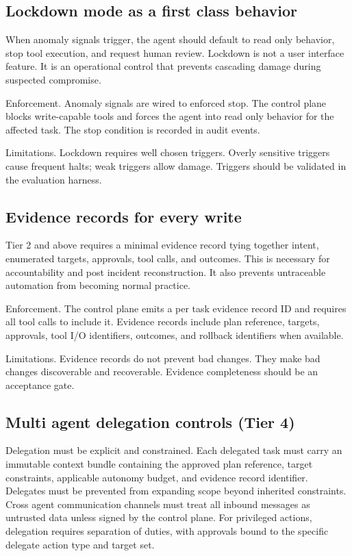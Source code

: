 \documentclass[11pt]{article}
\begin{document}
\subsection{Lockdown mode as a first class behavior}
When anomaly signals trigger, the agent should default to read only behavior, stop tool execution, and request human review. Lockdown is not a user interface feature. It is an operational control that prevents cascading damage during suspected compromise.

Enforcement. Anomaly signals are wired to enforced stop. The control plane blocks write-capable tools and forces the agent into read only behavior for the affected task. The stop condition is recorded in audit events.

Limitations. Lockdown requires well chosen triggers. Overly sensitive triggers cause frequent halts; weak triggers allow damage. Triggers should be validated in the evaluation harness.

\subsection{Evidence records for every write}
Tier 2 and above requires a minimal evidence record tying together intent, enumerated targets, approvals, tool calls, and outcomes. This is necessary for accountability and post incident reconstruction. It also prevents untraceable automation from becoming normal practice.

Enforcement. The control plane emits a per task evidence record ID and requires all tool calls to include it. Evidence records include plan reference, targets, approvals, tool I/O identifiers, outcomes, and rollback identifiers when available.

Limitations. Evidence records do not prevent bad changes. They make bad changes discoverable and recoverable. Evidence completeness should be an acceptance gate.

\subsection{Multi agent delegation controls (Tier 4)}
Delegation must be explicit and constrained. Each delegated task must carry an immutable context bundle containing the approved plan reference, target constraints, applicable autonomy budget, and evidence record identifier. Delegates must be prevented from expanding scope beyond inherited constraints. Cross agent communication channels must treat all inbound messages as untrusted data unless signed by the control plane. For privileged actions, delegation requires separation of duties, with approvals bound to the specific delegate action type and target set.
\end{document}
